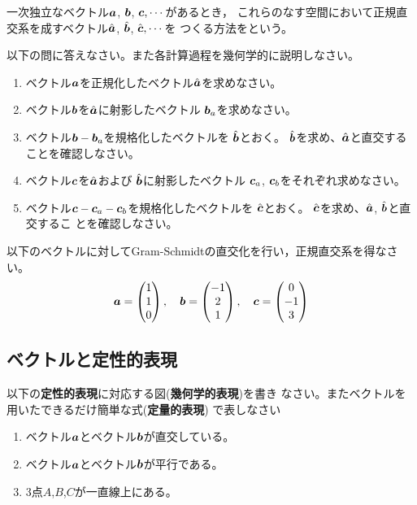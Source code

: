 \documentclass[twocolumn,11pt]{jarticle}
\begin{document}
一次独立なベクトル$\boldsymbol{a}$, $\boldsymbol{b}$, $\boldsymbol{c},\cdots$があるとき，
これらのなす空間において正規直交系を成すベクトル$\hat{\boldsymbol{a}}$,
$\hat{\boldsymbol{b}}$, $\hat{\boldsymbol{c}},\cdots$を
つくる方法をという。

\nquestion
以下の問に答えなさい。また各計算過程を幾何学的に説明しなさい。
\begin{enumerate}
\item ベクトル$\boldsymbol{a}$を正規化したベクトル$\hat{\boldsymbol{a}}$を求めなさい。
\item ベクトル$\boldsymbol{b}$を$\hat{\boldsymbol{a}}$に射影したベクトル
  $\boldsymbol{b}_a$を求めなさい。
\item ベクトル$\boldsymbol{b}-\boldsymbol{b}_a$を規格化したベクトルを
  $\hat{\boldsymbol{b}}$とおく。
  $\hat{\boldsymbol{b}}$を求め、$\hat{\boldsymbol{a}}$と直交することを確認しなさい。
\item ベクトル$\boldsymbol{c}$を$\hat{\boldsymbol{a}}$および
  $\hat{\boldsymbol{b}}$に射影したベクトル
  $\boldsymbol{c}_a$, $\boldsymbol{c}_b$をそれぞれ求めなさい。
\item ベクトル$\boldsymbol{c}-\boldsymbol{c}_a-\boldsymbol{c}_b$を規格化したベクトルを
  $\hat{\boldsymbol{c}}$とおく。
  $\hat{\boldsymbol{c}}$を求め、$\hat{\boldsymbol{a}}$, $\hat{\boldsymbol{b}}$と直交するこ
  とを確認しなさい。
\end{enumerate}
\nquestion
以下のベクトルに対してGram-Schmidtの直交化を行い，正規直交系を得なさい。
\begin{align}
  \boldsymbol{a}=
  \begin{pmatrix}
    1 \\ 1\\ 0
  \end{pmatrix},\quad
  \boldsymbol{b}=
  \begin{pmatrix}
    -1 \\ 2\\ 1
  \end{pmatrix},\quad
  \boldsymbol{c}=
  \begin{pmatrix}
    0 \\ -1\\ 3
  \end{pmatrix}\notag
\end{align}

\subsection{ベクトルと定性的表現}
以下の\textbf{定性的表現}に対応する図(\textbf{幾何学的表現})を書き
なさい。またベクトルを用いたできるだけ簡単な式(\textbf{定量的表現})
で表しなさい
\begin{enumerate}
\item ベクトル$\boldsymbol{a}$とベクトル$\boldsymbol{b}$が直交している。
\item ベクトル$\boldsymbol{a}$とベクトル$\boldsymbol{b}$が平行である。
\item 3点$A$,$B$,$C$が一直線上にある。
\end{enumerate}
\end{document}
